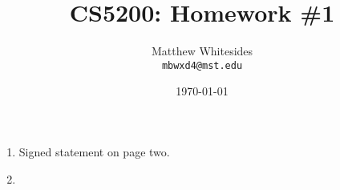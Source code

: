 \documentclass{article}
\title{CS5200: Homework \#1} %
\author{Matthew Whitesides\\ \texttt{mbwxd4@mst.edu}} %
\date{\today} %
\begin{document}
\maketitle %

\begin{enumerate}
  \item Signed statement on page two.
  \item 
\end{enumerate}
\end{document}
